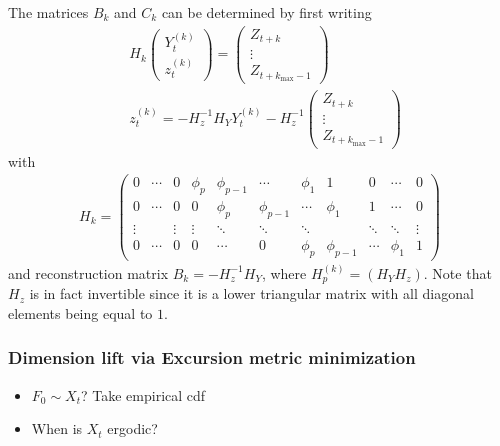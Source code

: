 The matrices $B_k$ and $C_k$ can be determined by first writing
\begin{align*}
    &H_k\begin{pmatrix}
        Y_{t}^{(k)}\\
        z_t^{(k)}
    \end{pmatrix}=\begin{pmatrix}
        Z_{t+k}\\
        \vdots\\
        Z_{t+k_{\max}-1}
    \end{pmatrix}\\&
    z_t^{(k)}=-H_z^{-1}H_YY_t^{(k)}-H_z^{-1}\begin{pmatrix}
        Z_{t+k}\\
        \vdots\\
        Z_{t+k_{\max}-1}
    \end{pmatrix}
\end{align*}
with
\begin{align*}
    H_k=\begin{pmatrix}
        0 & \cdots & 0 & \phi_p & \phi_{p-1} & \cdots & \phi_1 & 1 & 0 & \cdots & 0\\
        0 & \cdots & 0 & 0 & \phi_p & \phi_{p-1} & \cdots & \phi_1 & 1 & \cdots & 0\\
        \vdots & & \vdots & \vdots & \ddots & \ddots & \ddots & & \ddots & \ddots & \vdots\\
        0 & \cdots & 0 & 0 & \cdots & 0 & \phi_p & \phi_{p-1} & \cdots & \phi_1 & 1
    \end{pmatrix}
\end{align*}
and reconstruction matrix $B_k=-H_z^{-1}H_Y$, where $H_p^{(k)}=(H_Y H_z)$. Note that $H_z$ is in fact invertible since it is a lower triangular matrix with all diagonal elements being equal to $1$.


\subsubsection*{Dimension lift via Excursion metric minimization}

\begin{itemize}
    \item $F_0\sim X_t$? Take empirical cdf
    \item When is $X_t$ ergodic?
\end{itemize}

